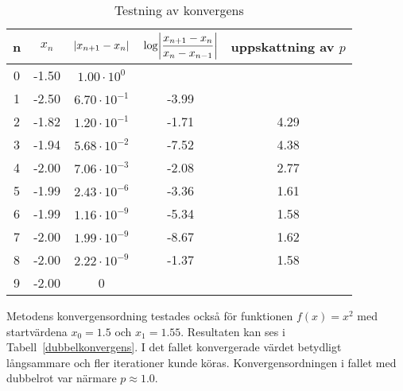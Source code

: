 \documentclass[12pt]{article}
\DeclarePairedDelimiter\abs{\lvert}{\rvert}
\begin{document}
\begin{table}[H]
  \centering
  \begin{tabu}{ c c c c c }
    n & $x_n$ & $\abs{x_{n+1}-x_n}$ & $\log\abs*{\dfrac{x_{n+1}-x_n}{x_n-x_{n-1}}}$ & uppskattning av $p$\\
     & -1.50 & $1.00 \cdot 10^0$ \\
    1 & -2.50 & $6.70 \cdot 10^{-1}$ & -3.99 & \\
    2 & -1.82 & $1.20 \cdot 10^{-1}$ & -1.71 & 4.29 \\
    3 & -1.94 & $5.68 \cdot 10^{-2}$ & -7.52 & 4.38 \\
    4 & -2.00 & $7.06 \cdot 10^{-3}$ & -2.08 & 2.77 \\
    5 & -1.99 & $2.43 \cdot 10^{-6}$ & -3.36 & 1.61 \\
    6 & -1.99 & $1.16 \cdot 10^{-9}$ & -5.34 & 1.58 \\
    7 & -2.00 & $1.99 \cdot 10^{-9}$ & -8.67 & 1.62 \\
    8 & -2.00 & $2.22 \cdot 10^{-9}$ & -1.37 & 1.58 \\
    9 & -2.00 & 0 \\
  \end{tabu}
  \caption{Testning av konvergens}\label{konvergens}
\end{table}

Metodens konvergensordning testades också för funktionen $f(x) = x^2$ med startvärdena $x_0=1.5$ och $x_1=1.55$. Resultaten kan ses i Tabell~\ref{dubbelkonvergens}. I det fallet konvergerade värdet betydligt långsammare och fler iterationer kunde köras. Konvergensordningen i fallet med dubbelrot var närmare $p\approx 1.0$. 
\end{document}
